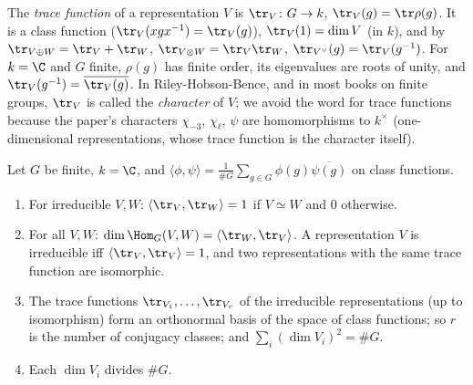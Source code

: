 \begin{definition}\label{def:reps:trace-character}
The \emph{trace function} of a representation $V$ is $\tr_V\colon G\to k$, $\tr_V(g)=\tr\rho(g)$. It is a class function ($\tr_V(xgx^{-1})=\tr_V(g)$),
$\tr_V(1)=\dim V$ (in $k$), and by  $\tr_{V\oplus W}=\tr_V+\tr_W$, $\tr_{V\otimes W}=\tr_V\tr_W$, $\tr_{V^\vee}(g)=\tr_V(g^{-1})$. For
$k=\C$ and $G$ finite, $\rho(g)$ has finite order, its eigenvalues are roots of unity, and $\tr_V(g^{-1})=\overline{\tr_V(g)}$. In
Riley-Hobson-Bence, and in most books on finite groups, $\tr_V$ is called the \emph{character} of $V$; we avoid the word for trace
functions because the paper's characters $\chi_{-3}$, $\chi_\ell$, $\psi$ are homomorphisms to $k^\times$ (one-dimensional representations, whose trace
function is the character itself).
\end{definition}

\begin{theorem}[Orthogonality]\label{thm:reps:orthogonality}
Let $G$ be finite, $k=\C$, and $\langle\phi,\psi\rangle=\frac1{\#G}\sum_{g\in G}\phi(g)\overline{\psi(g)}$ on class functions.
\begin{enumerate}[label=(\roman*)]
\item For irreducible $V,W$: $\langle\tr_V,\tr_W\rangle=1$ if $V\simeq W$ and $0$ otherwise.
\item For all $V,W$: $\dim\Hom_G(V,W)=\langle\tr_W,\tr_V\rangle$. A representation $V$ is irreducible iff $\langle\tr_V,\tr_V\rangle=1$, and two
representations with the same trace function are isomorphic.
\item The trace functions $\tr_{V_1},\dots,\tr_{V_r}$ of the irreducible representations (up to isomorphism) form an orthonormal basis of
the space of class functions; so $r$ is the number of conjugacy classes; and $\sum_i(\dim V_i)^2=\#G$.
\item Each $\dim V_i$ divides $\#G$.
\end{enumerate}
\end{theorem}

